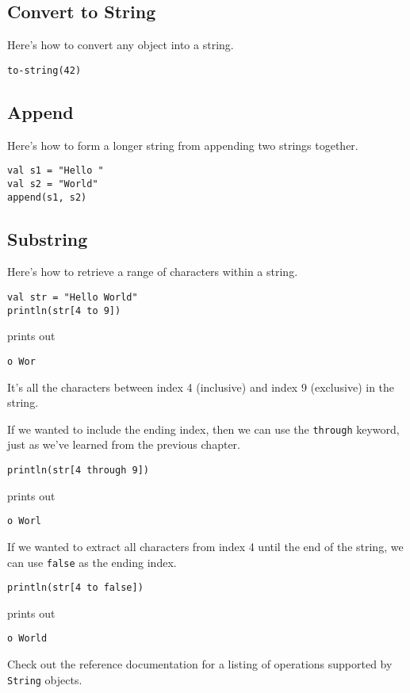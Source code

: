 \documentclass[10pt,oneside]{book}
\begin{document}
\subsection*{Convert to String}
Here's how to convert any object into a string.
\begin{lstlisting}
to-string(42)
\end{lstlisting}

\subsection*{Append}
Here's how to form a longer string from appending two strings together.
\begin{lstlisting}
val s1 = "Hello "
val s2 = "World"
append(s1, s2)
\end{lstlisting}

\subsection*{Substring}
Here's how to retrieve a range of characters within a string.
\begin{lstlisting}
val str = "Hello World"
println(str[4 to 9])
\end{lstlisting}
prints out
\begin{lstlisting}
o Wor
\end{lstlisting}
It's all the characters between index 4 (inclusive) and index 9 (exclusive) in the string.

If we wanted to include the ending index, then we can use the \texttt{\frenchspacing through} keyword, just as we've learned from the previous chapter.
\begin{lstlisting}
println(str[4 through 9])
\end{lstlisting}
prints out
\begin{lstlisting}
o Worl
\end{lstlisting}

If we wanted to extract all characters from index 4 until the end of the string, we can use \texttt{\frenchspacing false} as the ending index.
\begin{lstlisting}
println(str[4 to false])
\end{lstlisting}
prints out
\begin{lstlisting}
o World
\end{lstlisting}

Check out the reference documentation for a listing of operations supported by \texttt{\frenchspacing String} objects.
\end{document}
